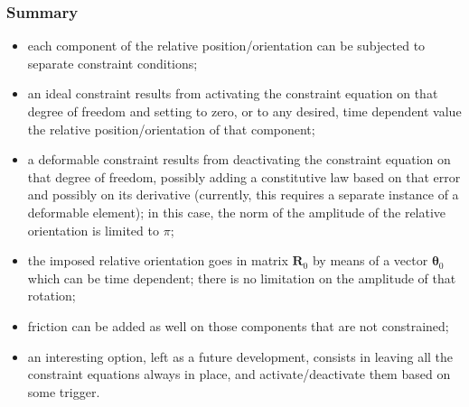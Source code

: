 \documentclass[10pt,dvips,fleqn]{report}
\newcommand{\T}[1]{\boldsymbol{#1}}
\begin{document}
\subsubsection{Summary}
\begin{itemize}
\item each component of the relative position/orientation can be subjected
to separate constraint conditions;
\item an ideal constraint results from activating the constraint equation
on that degree of freedom and setting to zero, or to any desired,
time dependent value the relative position/orientation of that component;
\item a deformable constraint results from deactivating the constraint
equation on that degree of freedom, possibly adding a constitutive law
based on that error and possibly on its derivative (currently, this requires
a separate instance of a deformable element);
in this case, the norm of the amplitude of the relative orientation 
is limited to $\pi$;
\item the imposed relative orientation goes in matrix $\T{R}_0$
by means of a vector $\T{\theta}_0$ which can be time dependent;
there is no limitation on the amplitude of that rotation;
\item friction can be added as well on those components
that are not constrained;
\item an interesting option, left as a future development, consists
in leaving all the constraint equations always in place,
and activate/deactivate them based on some trigger.
\end{itemize}
 
\end{document}
